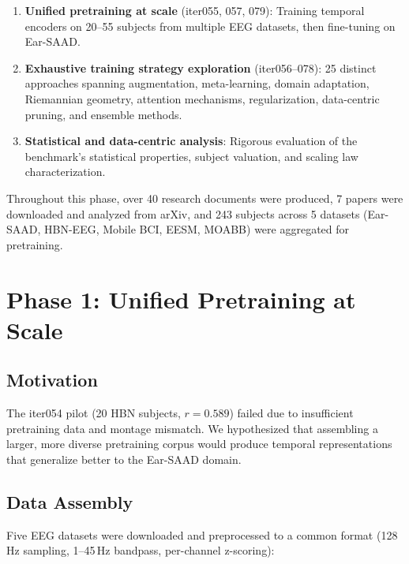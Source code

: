 \documentclass[11pt,a4paper]{article}
\begin{document}
\begin{enumerate}
  \item \textbf{Unified pretraining at scale} (iter055, 057, 079):
    Training temporal encoders on 20--55 subjects from multiple EEG
    datasets, then fine-tuning on Ear-SAAD.
  \item \textbf{Exhaustive training strategy exploration} (iter056--078):
    25 distinct approaches spanning augmentation, meta-learning, domain
    adaptation, Riemannian geometry, attention mechanisms, regularization,
    data-centric pruning, and ensemble methods.
  \item \textbf{Statistical and data-centric analysis}: Rigorous
    evaluation of the benchmark's statistical properties, subject valuation,
    and scaling law characterization.
\end{enumerate}

Throughout this phase, over 40 research documents were produced, 7 papers
were downloaded and analyzed from arXiv, and 243 subjects across 5 datasets
(Ear-SAAD, HBN-EEG, Mobile BCI, EESM, MOABB) were aggregated for
pretraining.

\section{Phase 1: Unified Pretraining at Scale}
\label{sec:pretrain}

\subsection{Motivation}

The iter054 pilot (20 HBN subjects, $r = 0.589$) failed due to
insufficient pretraining data and montage mismatch. We hypothesized that
assembling a larger, more diverse pretraining corpus would produce temporal
representations that generalize better to the Ear-SAAD domain.

\subsection{Data Assembly}

Five EEG datasets were downloaded and preprocessed to a common format
(128\,Hz sampling, 1--45\,Hz bandpass, per-channel z-scoring):
\end{document}
